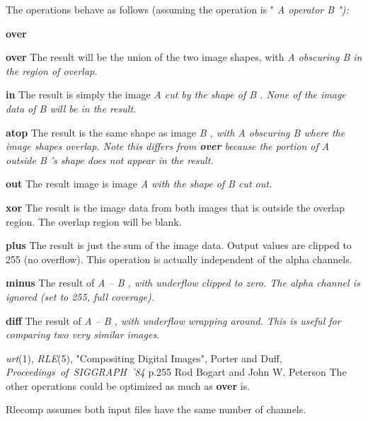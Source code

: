 The operations behave as follows (assuming the operation is
"%
\it A operator B\rm%
"):
\begin{TPlist}{{\bf over}}
\item[{{\bf over}}]
The result will be the union of the two
image shapes, with %
\it A \rm%
obscuring %
\it B \rm%
in the region of overlap.
\item[{{\bf in}}]
The result is simply the image %
\it A \rm%
cut by the shape of %
\it B\rm%
.
None of the image data of %
\it B \rm%
will be in the result.
\item[{{\bf atop}}]
The result is the same shape as image %
\it B\rm%
, with %
\it A \rm%
obscuring
%
\it B \rm%
where the image shapes overlap.  Note this differs from
{\bf over}
because the portion of %
\it A \rm%
outside %
\it B\rm%
's shape does not appear
in the result. 
\item[{{\bf out}}]
The result image is image %
\it A \rm%
with the shape of %
\it B \rm%
cut out.
\item[{{\bf xor}}]
The result is the image data from both images that is
outside the overlap region.  The overlap region will be blank.
\item[{{\bf plus}}]
The result is just the sum of the image data.  Output values are
clipped to 255 (no overflow).  This
operation is actually independent of the alpha channels.
\item[{{\bf minus}}]
The result of %
\it A \rm%
-- %
\it B\rm%
, with underflow clipped to zero.  The
alpha channel is ignored (set to 255, full coverage).
\item[{{\bf diff}}]
The result of %
\it A \rm%
-- %
\it B\rm%
, with underflow wrapping around.
This is useful for comparing two very similar images.
\end{TPlist}\par\noindent
{}
{\it urt}{\rm (1),}
{\it RLE}{\rm (5),}
\nwl
"Compositing Digital Images", Porter and Duff,
{\it Proceedings\ of\ SIGGRAPH\ '84}
p.255
Rod Bogart and John W. Peterson
The other operations could be optimized as much as 
{\bf over}
is.

Rlecomp assumes both input files have the same number of channels.
\newpage


